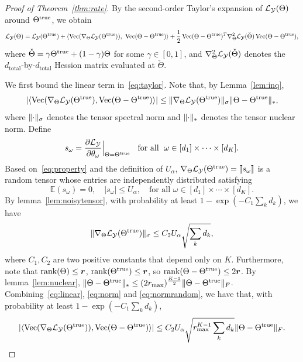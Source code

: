 \documentclass{article}
\theoremstyle{plain}
\theoremstyle{definition}
\begin{document}
\begin{proof}[Proof of Theorem~\ref{thm:rate}]
By the second-order Taylor's expansion of $\mathcal{L}_{\mathcal{Y}}(\Theta)$ around $\Theta^{\mathrm{true}}$, we obtain
\begin{equation}\label{eq:taylor}
\flogl(\Theta)=\flogl(\trueT)+\langle\Vec(\fplogl(\trueT)),\ \Vec(\Theta-\trueT)\rangle+{1\over 2}\Vec(\Theta-\trueT)^T\fpplogl(\check\Theta)\Vec(\Theta-\trueT),
\end{equation}
where $\check\Theta=\gamma\Theta^{\mathrm{true}}+(1-\gamma)\Theta$ for some $\gamma\in[0,1]$, and $\nabla^2_{\Theta}\mathcal{L}_{\mathcal{Y}}(\check\Theta)$ denotes the $d_{\text{total}}$-by-$d_\text{total}$ Hession matrix evaluated at $\check\Theta$.

We first bound the linear term in~\eqref{eq:taylor}. Note that, by Lemma~\ref{lem:inq},
\begin{equation}\label{eq:linear}
|\langle\operatorname{Vec}(\nabla_{\Theta}\mathcal{L}_{\mathcal{Y}}(\Theta^{\mathrm{true}}), \operatorname{Vec}(\Theta-\Theta^{\mathrm{true}})  \rangle|\leq \lVert\nabla_{\Theta}\mathcal{L}_{\mathcal{Y}}(\Theta^{\mathrm{true}})\rVert_\sigma \lVert\Theta-\Theta^{\mathrm{true}}\rVert_*,
\end{equation}
where $\lVert\cdot\rVert_\sigma$ denotes the tensor spectral norm and $\lVert\cdot\rVert_*$ denotes the tensor nuclear norm. Define
\[
s_\omega={\partial \mathcal{L}_{\mathcal{Y}}\over \partial \theta_\omega}\Big|_{\Theta=\Theta^{\mathrm{true}}} \;\; \textrm{ for all } \; \omega\in[d_1]\times\cdots\times [d_K].
\]
Based on~\eqref{eq:property} and the definition of $U_\alpha$, $\nabla_{\Theta}\mathcal{L}_{\mathcal{Y}}(\Theta^{\mathrm{true}})=\llbracket s_{\omega} \rrbracket$ is a random tensor whose entries are independently distributed satisfying
\begin{equation}\label{eq:norm}
\mathbb{E}(s_\omega)=0,\quad |s_\omega|\leq U_\alpha, \quad \text{for all }\omega\in[d_1]\times \cdots \times [d_K].
\end{equation}
By lemma~\ref{lem:noisytensor}, with probability at least $1-\exp(-C_1 \sum_kd_k)$, we have
\begin{equation}\label{eq:normrandom}
\lVert\nabla_{\Theta}\mathcal{L}_{\mathcal{Y}}(\Theta^{\mathrm{true}})\rVert_\sigma \leq C_2 U_\alpha\sqrt{\sum_k d_k},
\end{equation}
where $C_1, C_2$ are two positive constants that depend only on $K$. Furthermore, note that $\text{rank}(\Theta)\leq \bm{r}$, $\text{rank}(\Theta^{\mathrm{true}})\leq \bm{r}$, so $\text{rank}(\Theta-\Theta^{\mathrm{true}})\leq 2\bm{r}$. By lemma~\ref{lem:nuclear}, $\lVert\Theta-\Theta^{\mathrm{true}}\rVert_*\leq (2r_{\max})^{K-1\over 2}\lVert\Theta-\Theta^{\mathrm{true}}\rVert_F$. Combining~\eqref{eq:linear}, \eqref{eq:norm} and \eqref{eq:normrandom}, we have that, with probability at least $1-\exp(-C_1 \sum_kd_k)$,
\begin{equation}\label{eq:linearconclusion}
|\langle \operatorname{Vec}(\nabla_{\Theta}\mathcal{L}_{\mathcal{Y}}(\Theta^{\mathrm{true}})), \operatorname{Vec}(\Theta-\Theta^{\mathrm{true}})  \rangle | \leq C_2 U_\alpha  \sqrt{r_{\max}^{K-1} \sum_k d_k}  \lVert\Theta-\Theta^{\mathrm{true}}\rVert_F.
\end{equation}


\end{proof}
\end{document}
